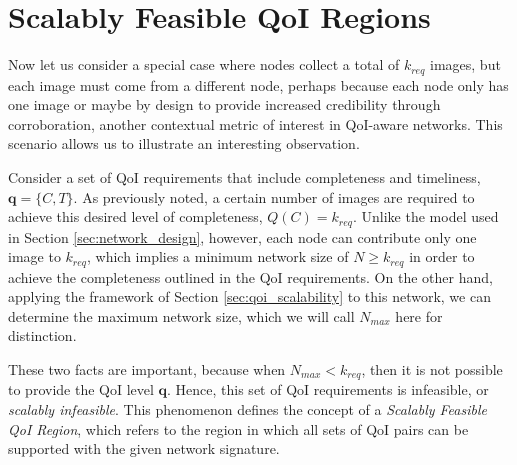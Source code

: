 \section{Scalably Feasible QoI Regions}
\label{sec:scal_feasible_qoi}

Now let us consider a special case where nodes collect a total of $k_{req}$ images, but each image must come from a different node, perhaps because each node only has one image or maybe by design to provide increased credibility through corroboration, another contextual metric of interest in QoI-aware networks. This scenario allows us to illustrate an interesting observation.  

Consider a set of QoI requirements that include completeness and timeliness, $\mathbf{q} = \{C,T\}$.  As previously noted, a certain number of images are required to achieve this desired level of completeness, $Q(C) = k_{req}$.  Unlike the model used in Section \ref{sec:network_design}, however, each node can contribute only one image to $k_{req}$, which implies a minimum network size of $N \geq k_{req}$ in order to achieve the completeness outlined in the QoI requirements.  On the other hand, applying the framework of Section \ref{sec:qoi_scalability} to this network, we can determine the maximum network size, which we will call $N_{max}$ here for distinction.  

These two facts are important, because when $N_{max} < k_{req}$, then it is not possible to provide the QoI level $\mathbf{q}$.  Hence, this set of QoI requirements is infeasible, or \emph{scalably infeasible}.  This phenomenon defines the concept of a \emph{Scalably Feasible QoI Region}, which refers to the region in which all sets of QoI pairs can be supported with the given network signature.  

